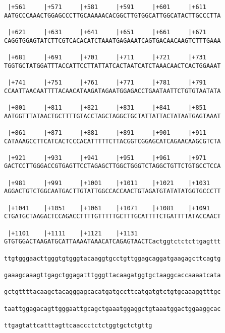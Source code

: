 \documentclass{article}
\begin{document}
\begin{Verbatim}
 |+561     |+571     |+581     |+591     |+601     |+611    
AATGCCCAAACTGGAGCCCTTGCAAAAACACGGCTTGTGGCATTGGCATACTTGCCCTTA

 |+621     |+631     |+641     |+651     |+661     |+671    
CAGGTGGAGTATCTTCGTCACACATCTAAATGAGAAATCAGTGACAACAAGTCTTTGAAA

 |+681     |+691     |+701     |+711     |+721     |+731    
TGGTGCTATGGATTTACCATTCCTTATTATCACTAATCATCTAAACAACTCACTGGAAAT

 |+741     |+751     |+761     |+771     |+781     |+791    
CCAATTAACAATTTTACAACATAAGATAGAATGGAGACCTGAATAATTCTGTGTAATATA

 |+801     |+811     |+821     |+831     |+841     |+851    
AATGGTTTATAACTGCTTTTGTACCTAGCTAGGCTGCTATTATTACTATAATGAGTAAAT

 |+861     |+871     |+881     |+891     |+901     |+911    
CATAAAGCCTTCATCACTCCCACATTTTTCTTACGGTCGGAGCATCAGAACAAGCGTCTA

 |+921     |+931     |+941     |+951     |+961     |+971    
GACTCCTTGGGACCGTGAGTTCCTAGAGCTTGGCTGGGTCTAGGCTGTTCTGTGCCTCCA

 |+981     |+991     |+1001    |+1011    |+1021    |+1031   
AGGACTGTCTGGCAATGACTTGTATTGGCCACCAACTGTAGATGTATATATGGTGCCCTT

 |+1041    |+1051    |+1061    |+1071    |+1081    |+1091   
CTGATGCTAAGACTCCAGACCTTTTGTTTTTGCTTTGCATTTTCTGATTTTATACCAACT

 |+1101    |+1111    |+1121    |+1131                       
GTGTGGACTAAGATGCATTAAAATAAACATCAGAGTAACTCactggtctctcttgagttt

ttgtgggaacttgggtgtgggtacaaggtgcctgttggagcaggatgaagagcttcagtg

gaaagcaaagttgagctggagatttgggttacaagatggtgctaaggcaccaaaatcata

gctgttttacaagctacagggagcacatgatgccttcatgatgtctgtgcaaaggtttgc

taattggagacagttgggaattgcagctgaaatggaggctgtaaatggactggaaggcac

ttgagtattcatttagttcaaccctctctggtgctctgttg
                                         

\end{Verbatim}
\end{document}
